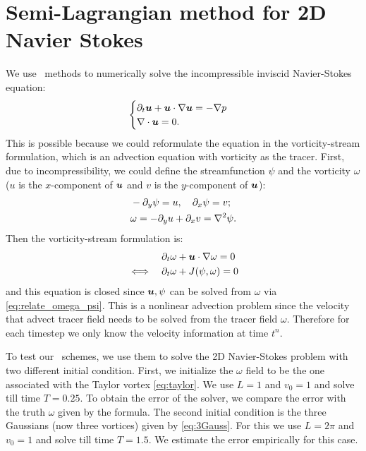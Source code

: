 \documentclass[11pt,letterpaper]{article}
\begin{document}
\begin{figure}[H]
    \caption{}\label{fig:conv_order_finu_}
\end{figure}

\section{Semi-Lagrangian method for 2D Navier Stokes}\label{sec:nonli_adv}
We use \sml\ methods to numerically solve the incompressible inviscid Navier-Stokes equation:
\begin{align}
    \begin{cases}
    \partial_t\boldsymbol{u}+\boldsymbol{u}\cdot\nabla\boldsymbol{u}=-\nabla p\\
    \nabla\cdot\boldsymbol{u} = 0.
    \end{cases}\label{eq:2d_Nav}
\end{align}
This is possible because we could reformulate the equation in the vorticity-stream formulation, which is an advection equation with vorticity as the tracer. First, due to incompressibility, we could define the streamfunction $\psi$ and the vorticity $\omega$ ($u$ is the $x$-component of $\boldsymbol{u}$ and $v$ is the $y$-component of $\boldsymbol{u}$):
\begin{align}
    &-\partial_y \psi = u,\quad  \partial_x \psi = v;\nonumber\\
    &\omega = -\partial_y u+\partial_x v = \nabla^2 \psi.\label{eq:relate_omega_psi}
\end{align}
Then the vorticity-stream formulation is:
\begin{align}
    &\partial_t\omega+\boldsymbol{u}\cdot\nabla\omega = 0\label{eq:vort_stream}\\
    \iff\quad&\partial_t\omega+J(\psi,\omega) = 0\nonumber
\end{align}
and this equation is closed since $\boldsymbol{u},\psi$ can be solved from $\omega$ via \eqref{eq:relate_omega_psi}. This is a nonlinear advection problem since the velocity that advect tracer field needs to be solved from the tracer field $\omega$. Therefore for each timestep we only know the velocity information at time $t^n$. 

To test our \sml\ schemes, we use them to solve the 2D Navier-Stokes problem with two different initial condition. First, we initialize the $\omega$ field to be the one associated with the Taylor vortex \eqref{eq:taylor}. We use $L = 1$ and $v_0 = 1$ and solve till time $T = 0.25$. To obtain the error of the solver, we compare the error with the truth $\omega$ given by the formula. The second initial condition is the three Gaussians (now three vortices) given by \eqref{eq:3Gauss}. For this we use $L = 2\pi$ and $v_0 = 1$ and solve till time $T = 1.5$. We estimate the error empirically for this case. 
\end{document}
